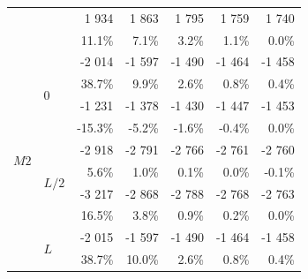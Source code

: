 \begin{figure}[p]
\begin{fullpage}
\begin{tabularx}{0.65\textwidth}{@{} XX rrrrr@{}}
&&{\color{black}\normalsize1 934}&{\color{black}\normalsize1 863}&{\color{black}\normalsize1 795}&{\color{black}\normalsize1 759}&{\color{black}\normalsize1 740}\\
&&{\color{black}\scriptsize11.1\%}&{\color{black}\scriptsize7.1\%}&{\color{black}\scriptsize3.2\%}&{\color{black}\scriptsize1.1\%}&{\color{black}\scriptsize0.0\%}\\\midrule
\multirow{12}{*}{$M2$}&\multirow{4}{*}{$0$}&{\color{Tblue}\normalsize-2 014}&{\color{Tblue}\normalsize-1 597}&{\color{Tblue}\normalsize-1 490}&{\color{Tblue}\normalsize-1 464}&{\color{Tblue}\normalsize-1 458}\\
&&{\color{Tblue}\scriptsize38.7\%}&{\color{Tblue}\scriptsize9.9\%}&{\color{Tblue}\scriptsize2.6\%}&{\color{Tblue}\scriptsize0.8\%}&{\color{Tblue}\scriptsize0.4\%}\\
&&{\color{black}\normalsize-1 231}&{\color{black}\normalsize-1 378}&{\color{black}\normalsize-1 430}&{\color{black}\normalsize-1 447}&{\color{black}\normalsize-1 453}\\
&&{\color{black}\scriptsize-15.3\%}&{\color{black}\scriptsize-5.2\%}&{\color{black}\scriptsize-1.6\%}&{\color{black}\scriptsize-0.4\%}&{\color{black}\scriptsize0.0\%}\\\cmidrule[0.5\cmidrulewidth]{2-7}
&\multirow{4}{*}{$L/2$}&{\color{Tblue}\normalsize-2 918}&{\color{Tblue}\normalsize-2 791}&{\color{Tblue}\normalsize-2 766}&{\color{Tblue}\normalsize-2 761}&{\color{Tblue}\normalsize-2 760}\\
&&{\color{Tblue}\scriptsize5.6\%}&{\color{Tblue}\scriptsize1.0\%}&{\color{Tblue}\scriptsize0.1\%}&{\color{Tblue}\scriptsize0.0\%}&{\color{Tblue}\scriptsize-0.1\%}\\
&&{\color{black}\normalsize-3 217}&{\color{black}\normalsize-2 868}&{\color{black}\normalsize-2 788}&{\color{black}\normalsize-2 768}&{\color{black}\normalsize-2 763}\\
&&{\color{black}\scriptsize16.5\%}&{\color{black}\scriptsize3.8\%}&{\color{black}\scriptsize0.9\%}&{\color{black}\scriptsize0.2\%}&{\color{black}\scriptsize0.0\%}\\\cmidrule[0.5\cmidrulewidth]{2-7}
&\multirow{4}{*}{$L$}&{\color{Tblue}\normalsize-2 015}&{\color{Tblue}\normalsize-1 597}&{\color{Tblue}\normalsize-1 490}&{\color{Tblue}\normalsize-1 464}&{\color{Tblue}\normalsize-1 458}\\
&&{\color{Tblue}\scriptsize38.7\%}&{\color{Tblue}\scriptsize10.0\%}&{\color{Tblue}\scriptsize2.6\%}&{\color{Tblue}\scriptsize0.8\%}&{\color{Tblue}\scriptsize0.4\%}\\

\end{tabularx}
\end{fullpage}
\end{figure}
